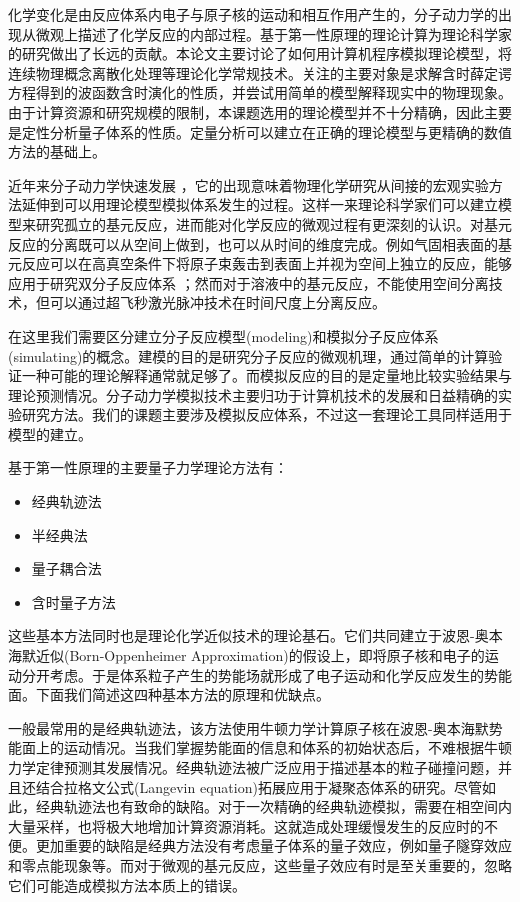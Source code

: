 
化学变化是由反应体系内电子与原子核的运动和相互作用产生的，分子动力学的出现从微观上描述了化学反应的内部过程。基于第一性原理的理论计算为理论科学家的研究做出了长远的贡献。本论文主要讨论了如何用计算机程序模拟理论模型，将连续物理概念离散化处理等理论化学常规技术。关注的主要对象是求解含时薛定谔方程得到的波函数含时演化的性质，并尝试用简单的模型解释现实中的物理现象。由于计算资源和研究规模的限制，本课题选用的理论模型并不十分精确，因此主要是定性分析量子体系的性质。定量分析可以建立在正确的理论模型与更精确的数值方法的基础上。

近年来分子动力学快速发展\cite{ab_initio} ，它的出现意味着物理化学研究从间接的宏观实验方法延伸到可以用理论模型模拟体系发生的过程。这样一来理论科学家们可以建立模型来研究孤立的基元反应，进而能对化学反应的微观过程有更深刻的认识。对基元反应的分离既可以从空间上做到，也可以从时间的维度完成。例如气固相表面的基元反应可以在高真空条件下将原子束轰击到表面上\cite{molecular_beam}并视为空间上独立的反应，能够应用于研究双分子反应体系\cite{bimolecular_reaction_1,bimolecular_reaction_2} ；然而对于溶液中的基元反应，不能使用空间分离技术，但可以通过超飞秒激光脉冲技术在时间尺度上分离反应\cite{femto_isolation}。

在这里我们需要区分建立分子反应模型(modeling)和模拟分子反应体系(simulating)的概念。建模的目的是研究分子反应的微观机理，通过简单的计算验证一种可能的理论解释通常就足够了。而模拟反应的目的是定量地比较实验结果与理论预测情况。分子动力学模拟技术主要归功于计算机技术的发展和日益精确的实验研究方法。我们的课题主要涉及模拟反应体系，不过这一套理论工具同样适用于模型的建立。

基于第一性原理的主要量子力学理论方法有：
\begin{multicols}{2}
\begin{itemize}
  \item 经典轨迹法
  \item 半经典法
  \item 量子耦合法
  \item 含时量子方法
\end{itemize}
\end{multicols}
这些基本方法同时也是理论化学近似技术的理论基石。它们共同建立于波恩-奥本海默近似(Born-Oppenheimer Approximation)\cite{BO_approx}的假设上，即将原子核和电子的运动分开考虑。于是体系粒子产生的势能场就形成了电子运动和化学反应发生的势能面。下面我们简述这四种基本方法的原理和优缺点。

一般最常用的是经典轨迹法\cite{classical_trajectory_1,classical_trajectory_2}，该方法使用牛顿力学计算原子核在波恩-奥本海默势能面上的运动情况。当我们掌握势能面的信息和体系的初始状态后，不难根据牛顿力学定律预测其发展情况。经典轨迹法被广泛应用于描述基本的粒子碰撞问题，并且还结合拉格文公式(Langevin equation)拓展应用于凝聚态体系的研究\cite{classical_extend}。尽管如此，经典轨迹法也有致命的缺陷。对于一次精确的经典轨迹模拟，需要在相空间内大量采样，也将极大地增加计算资源消耗。这就造成处理缓慢发生的反应时的不便。更加重要的缺陷是经典方法没有考虑量子体系的量子效应，例如量子隧穿效应和零点能现象等。而对于微观的基元反应，这些量子效应有时是至关重要的，忽略它们可能造成模拟方法本质上的错误。

